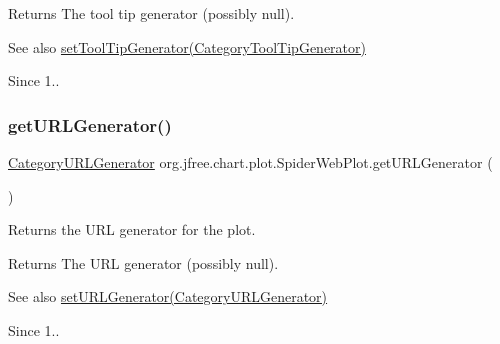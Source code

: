 \begin{DoxyReturn}{Returns}
The tool tip generator (possibly {\ttfamily null}).
\end{DoxyReturn}
\begin{DoxySeeAlso}{See also}
\mbox{\hyperlink{classorg_1_1jfree_1_1chart_1_1plot_1_1_spider_web_plot_ad4eaa6c6e790c66b4146ee7f0a1fd455}{set\+Tool\+Tip\+Generator(\+Category\+Tool\+Tip\+Generator)}}
\end{DoxySeeAlso}
\begin{DoxySince}{Since}
1.. 
\end{DoxySince}
\mbox{\label{classorg_1_1jfree_1_1chart_1_1plot_1_1_spider_web_plot_a5ff43ff8150727508cf5789a00491db6}} 
\subsubsection{\texorpdfstring{get\+U\+R\+L\+Generator()}{getURLGenerator()}}
{\footnotesize\ttfamily \mbox{\hyperlink{interfaceorg_1_1jfree_1_1chart_1_1urls_1_1_category_u_r_l_generator}{Category\+U\+R\+L\+Generator}} org.\+jfree.\+chart.\+plot.\+Spider\+Web\+Plot.\+get\+U\+R\+L\+Generator (\begin{DoxyParamCaption}{ }\end{DoxyParamCaption})}

Returns the U\+RL generator for the plot.

\begin{DoxyReturn}{Returns}
The U\+RL generator (possibly {\ttfamily null}).
\end{DoxyReturn}
\begin{DoxySeeAlso}{See also}
\mbox{\hyperlink{classorg_1_1jfree_1_1chart_1_1plot_1_1_spider_web_plot_a8400df465e80c5fb7ba648adaf51bff5}{set\+U\+R\+L\+Generator(\+Category\+U\+R\+L\+Generator)}}
\end{DoxySeeAlso}
\begin{DoxySince}{Since}
1.. 
\end{DoxySince}
\mbox{\label{classorg_1_1jfree_1_1chart_1_1plot_1_1_spider_web_plot_a780a7b8154c4dff47f250ead19ea4de3}} 
